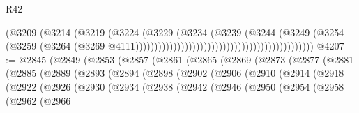 \begin{lexlean}{R42}
\begin{coremodule}
{                                                                        (@3209
                                                                          (@3214
                                                                            (@3219
                                                                              (@3224
                                                                                (@3229
                                                                                  (@3234
                                                                                    (@3239
                                                                                      (@3244
                                                                                        (@3249
                                                                                          (@3254
                                                                                            (@3259
                                                                                              (@3264
                                                                                                (@3269
                                                                                                  @4111)))))))))))))))))))))))))))))))))))))))))))))))
@4207 := @2845
    (@2849
      (@2853
        (@2857
          (@2861
            (@2865
              (@2869
                (@2873
                  (@2877
                    (@2881
                      (@2885
                        (@2889
                          (@2893
                            (@2894
                              (@2898
                                (@2902
                                  (@2906
                                    (@2910
                                      (@2914
                                        (@2918
                                          (@2922
                                            (@2926
                                              (@2930
                                                (@2934
                                                  (@2938
                                                    (@2942
                                                      (@2946
                                                        (@2950
                                                          (@2954
                                                            (@2958
                                                              (@2962
                                                                (@2966
}
\end{coremodule}
\end{lexlean}
